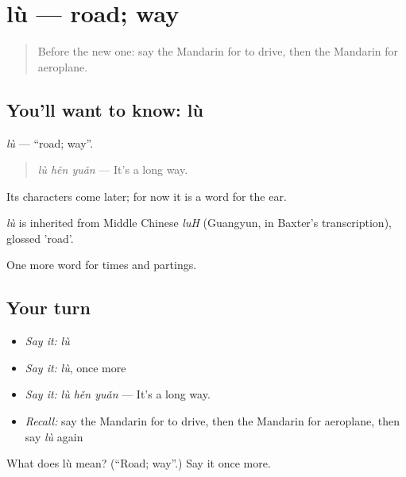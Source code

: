 \section[lù]{lù — road; way}

\label{lesson:ZH-C72-lu}



\begin{quote}
Before the new one: say the Mandarin for to drive, then the Mandarin for aeroplane.
\end{quote}

\subsection*{You'll want to know: lù}
\emph{lù} — \textquotedblleft{}road; way\textquotedblright{}.

\begin{quote}
\emph{lù hěn yuǎn} — It's a long way.
\end{quote}

Its characters come later; for now it is a word for the ear.

\begin{cousinweb}
\emph{lù} is inherited from Middle Chinese \emph{luH} (Guangyun, in Baxter's transcription), glossed 'road'.
\end{cousinweb}

\begin{grammarlens}[title={What you've built}]
One more word for times and partings.
\end{grammarlens}

\subsection*{Your turn}
\begin{itemize}
\raggedright
  \item \emph{Say it:} \emph{lù}
  \item \emph{Say it:} \emph{lù}, once more
  \item \emph{Say it:} \emph{lù hěn yuǎn} — It's a long way.
  \item \emph{Recall:} say the Mandarin for to drive, then the Mandarin for aeroplane, then say \emph{lù} again
\end{itemize}

\begin{tcolorbox}[breakable,colback=teal!4,colframe=teal!35!black,title={Before you move on}]
What does lù mean? (\textquotedblleft{}Road; way\textquotedblright{}.) Say it once more.
\end{tcolorbox}

